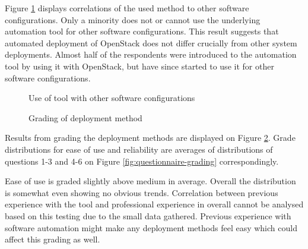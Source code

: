 Figure \ref{fig:other-software-configurations} displays correlations of the
used method to other software configurations. Only a minority does not or
cannot use the underlying automation tool for other software configurations.
This result suggests that automated deployment of OpenStack does not differ
crucially from other system deployments. Almost half of the respondents were
introduced to the automation tool by using it with OpenStack, but have since
started to use it for other software configurations.

\begin{figure}[t]
\centering
{}
\caption{Use of tool with other software configurations}
\label{fig:other-software-configurations}
\end{figure}

\begin{figure}[t]
\centering
{}
\caption{Grading of deployment method}
\label{fig:method-grading}
\end{figure}

Results from grading the deployment methods are displayed on Figure
\ref{fig:method-grading}. Grade distributions for ease of use and reliability
are averages of distributions of questions 1-3 and 4-6 on Figure
\ref{fig:questionnaire-grading} correspondingly.

Ease of use is graded slightly above medium in average. Overall the
distribution is somewhat even showing no obvious trends. Correlation between
previous experience with the tool and professional experience in overall cannot
be analysed based on this testing due to the small data gathered. Previous
experience with software automation might make any deployment methods feel easy
which could affect this grading as well.

